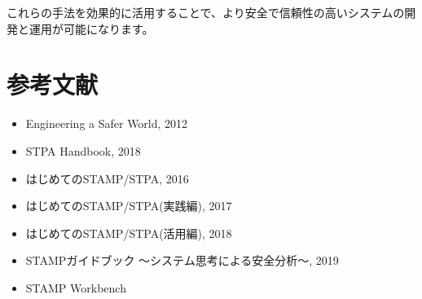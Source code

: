 これらの手法を効果的に活用することで、より安全で信頼性の高いシステムの開発と運用が可能になります。

\section{参考文献}
\begin{itemize}
    \item Engineering a Safer World, 2012
    \item STPA Handbook, 2018
    \item はじめてのSTAMP/STPA, 2016
    \item はじめてのSTAMP/STPA(実践編), 2017
    \item はじめてのSTAMP/STPA(活用編), 2018
    \item STAMPガイドブック ～システム思考による安全分析～, 2019
    \item STAMP Workbench
\end{itemize}